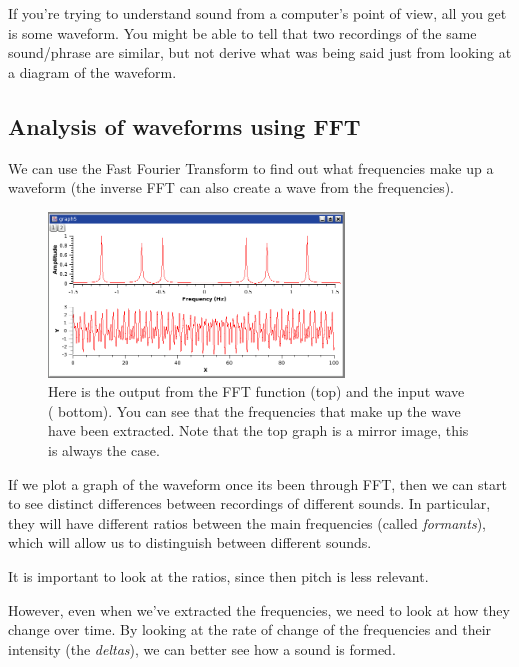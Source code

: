 If you're trying to understand sound from a computer's point of view, all you
get is some waveform. You might be able to tell that two recordings of the same
sound/phrase are similar, but not derive what was being said just from looking
at a diagram of the waveform.

\subsection{Analysis of waveforms using FFT}


We can use the Fast Fourier Transform to find out what frequencies make up a
waveform (the inverse FFT can also create a wave from the frequencies).

\begin{figure}[H]
  \centering
  \includegraphics[width=0.7\textwidth]{images/fft}
  \caption{Here is the output from the FFT function (top) and the input wave (
  bottom). You can see that the frequencies that make up the wave have been 
  extracted. Note that the top graph is a mirror image, this is always the
  case.}
  \label{fig:fft}
\end{figure}

If we plot a graph of the waveform once its been through FFT, then we can start
to see distinct differences between recordings of different sounds. In
particular, they will have different ratios between the main frequencies (called
\textit{formants}), which will allow us to distinguish between different sounds.

It is important to look at the ratios, since then pitch is less relevant.

However, even when we've extracted the frequencies, we need to look at how they
change over time. By looking at the rate of change of the frequencies and their
intensity (the \textit{deltas}), we can better see how a sound is formed.

